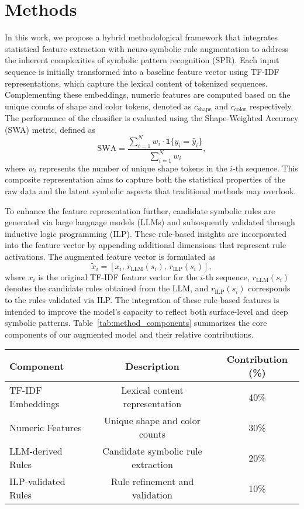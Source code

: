 \documentclass{article}
\begin{document}
\section{Methods}
In this work, we propose a hybrid methodological framework that integrates statistical feature extraction with neuro‐symbolic rule augmentation to address the inherent complexities of symbolic pattern recognition (SPR). Each input sequence is initially transformed into a baseline feature vector using TF-IDF representations, which capture the lexical content of tokenized sequences. Complementing these embeddings, numeric features are computed based on the unique counts of shape and color tokens, denoted as \( c_{\text{shape}} \) and \( c_{\text{color}} \) respectively. The performance of the classifier is evaluated using the Shape-Weighted Accuracy (SWA) metric, defined as
\[
\text{SWA} = \frac{\sum_{i=1}^{N} w_i \cdot \mathbf{1}\{y_i = \hat{y}_i\}}{\sum_{i=1}^{N} w_i},
\]
where \( w_i \) represents the number of unique shape tokens in the \( i \)-th sequence. This composite representation aims to capture both the statistical properties of the raw data and the latent symbolic aspects that traditional methods may overlook.

To enhance the feature representation further, candidate symbolic rules are generated via large language models (LLMs) and subsequently validated through inductive logic programming (ILP). These rule-based insights are incorporated into the feature vector by appending additional dimensions that represent rule activations. The augmented feature vector is formulated as
\[
\tilde{x}_i = \left[ x_i, \, r_{\text{LLM}}(s_i), \, r_{\text{ILP}}(s_i) \right],
\]
where \( x_i \) is the original TF-IDF feature vector for the \( i \)-th sequence, \( r_{\text{LLM}}(s_i) \) denotes the candidate rules obtained from the LLM, and \( r_{\text{ILP}}(s_i) \) corresponds to the rules validated via ILP. The integration of these rule-based features is intended to improve the model's capacity to reflect both surface-level and deep symbolic patterns. Table~\ref{tab:method_components} summarizes the core components of our augmented model and their relative contributions.

\begin{center}
\begin{tabular}{lcc}
\hline
Component             & Description                                 & Contribution (\%) \\
\hline
TF-IDF Embeddings     & Lexical content representation              & 40\% \\
Numeric Features      & Unique shape and color counts               & 30\% \\
LLM-derived Rules     & Candidate symbolic rule extraction         & 20\% \\
ILP-validated Rules   & Rule refinement and validation              & 10\% \\
\hline
\end{tabular}
\label{tab:method_components}
\end{center}
\end{document}
